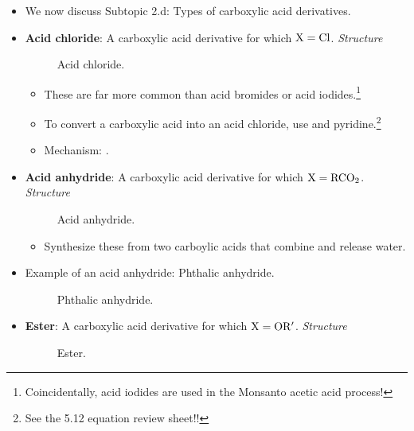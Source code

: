 \documentclass[../notes.tex]{subfiles}
\begin{document}
\begin{itemize}
    \item We now discuss Subtopic 2.d{}: Types of carboxylic acid derivatives.
    \item \textbf{Acid chloride}: A carboxylic acid derivative for which $\ce{X}=\ce{Cl}$. \emph{Structure}
    \begin{figure}[H]
        \centering
        \footnotesize
        \caption{Acid chloride.}
        \label{fig:carbAcidCl}
    \end{figure}
    \begin{itemize}
        \item These are far more common than acid bromides or acid iodides.\footnote{Coincidentally, acid iodides are used in the Monsanto acetic acid process!}
        \item To convert a carboxylic acid into an acid chloride, use  and pyridine.\footnote{See the 5.12 equation review sheet!!}
        \item Mechanism: \textcite[214-215]{bib:Clayden}.
    \end{itemize}
    \item \textbf{Acid anhydride}: A carboxylic acid derivative for which $\ce{X}=\ce{RCO2}$. \emph{Structure}
    \begin{figure}[h!]
        \centering
        \footnotesize
        \caption{Acid anhydride.}
        \label{fig:carbAcidAnh}
    \end{figure}
    \begin{itemize}
        \item Synthesize these from two carboylic acids that combine and release water.
    \end{itemize}
    \item Example of an acid anhydride: Phthalic anhydride.
    \begin{figure}[h!]
        \centering
        \footnotesize
        \caption{Phthalic anhydride.}
        \label{fig:phthalicAnhydride}
    \end{figure}
    \item \textbf{Ester}: A carboxylic acid derivative for which $\ce{X}=\ce{OR$'$}$. \emph{Structure}
    \begin{figure}[h!]
        \centering
        \footnotesize
        \caption{Ester.}
        \label{fig:carbEster}
    \end{figure}

\end{itemize}
\end{document}
